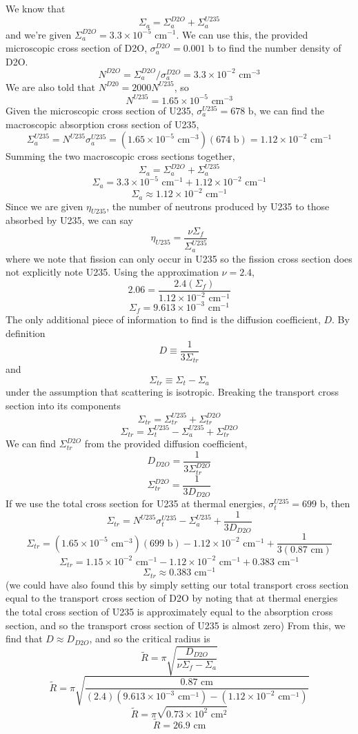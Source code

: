 \documentclass{article}
\newcommand{\Xs}{\Sigma}
\newcommand{\xs}{\sigma}
\begin{document}
We know that 
$$ \Xs_a = \Xs_a^{D2O} + \Xs_a^{U235} $$
and we're given $\Xs_a^{D2O} = 3.3\times10^{-5}\text{ cm}^{-1}$. We can use this, the provided microscopic cross section of D2O, $\xs_a^{D2O} = 0.001\text{ b}$ to find the number density of D2O.
$$ N^{D2O} = \Xs_a^{D2O}/\xs_a^{D2O} = 3.3\times10^{-2}\text{ cm}^{-3} $$
We are also told that $N^{D20} = 2000N^{U235}$, so
$$ N^{U235} = 1.65\times10^{-5}\text{ cm}^{-3} $$
Given the microscopic cross section of U235, $\xs_a^{U235} = 678\text{ b}$,
we can find the macroscopic absorption cross section of U235,
$$ \Xs_a^{U235} = N^{U235}\xs_a^{U235} = (1.65\times10^{-5}\text{ cm}^{-3})(674\text{ b}) = 1.12\times10^{-2}\text{ cm}^{-1} $$
Summing the two macroscopic cross sections together,
$$ \Xs_a = \Xs_a^{D2O} + \Xs_a^{U235} $$
$$ \Xs_a = 3.3\times10^{-5}\text{ cm}^{-1} + 1.12\times10^{-2}\text{ cm}^{-1} $$
$$ \Xs_a \approx 1.12\times10^{-2}\text{ cm}^{-1} $$
Since we are given $\eta_{U235}$, the number of neutrons produced by U235 to those absorbed by U235, we can say
$$ \eta_{U235} = \frac{\nu\Xs_f}{\Xs_a^{U235}} $$
where we note that fission can only occur in U235 so the fission cross section does not explicitly note U235. Using the approximation $\nu = 2.4$,
$$ 2.06 = \frac{2.4(\Xs_f)}{1.12\times10^{-2}\text{ cm}^{-1}} $$
$$ \Xs_f = 9.613\times10^{-3}\text{ cm}^{-1} $$
The only additional piece of information to find is the diffusion coefficient, $D$. By definition
$$ D \equiv \frac{1}{3\Xs_{tr}} $$
and 
$$ \Xs_{tr} \equiv \Xs_t - \Xs_a $$
under the assumption that scattering is isotropic. Breaking the transport cross section into its components
$$ \Xs_{tr} = \Xs_{tr}^{U235} + \Xs_{tr}^{D2O} $$
$$ \Xs_{tr} = \Xs_t^{U235} - \Xs_a^{U235} + \Xs_{tr}^{D2O}$$
We can find $\Xs_{tr}^{D2O}$ from the provided diffusion coefficient,
$$ D_{D2O} = \frac{1}{3\Xs_{tr}^{D2O}} $$
$$ \Xs_{tr}^{D2O} = \frac{1}{3D_{D2O}} $$
If we use the total cross section for U235 at thermal energies, $\xs_t^{U235} = 699\text{ b}$, then
$$ \Xs_{tr} = N^{U235}\xs_t^{U235} - \Xs_a^{U235} + \frac{1}{3D_{D2O}} $$
$$ \Xs_{tr} = (1.65\times10^{-5}\text{ cm}^{-3})(699 \text{ b}) - 1.12\times10^{-2}\text{ cm}^{-1} + \frac{1}{3(0.87\text{ cm})} $$
$$ \Xs_{tr} = 1.15\times10^{-2}\text{ cm}^{-1} - 1.12\times10^{-2}\text{ cm}^{-1} + 0.383\text{ cm}^{-1} $$
$$ \Xs_{tr} \approx 0.383\text{ cm}^{-1} $$
(we could have also found this by simply setting our total transport cross section equal to the transport cross section of D2O by noting that at thermal energies the total cross section of U235 is approximately equal to the absorption cross section, and so the transport cross section of U235 is almost zero)
From this, we find that $D \approx D_{D2O}$, and so the critical radius is
$$ \tilde{R} = \pi\sqrt{\frac{D_{D2O}}{\nu\Xs_f - \Xs_a}} $$
$$ \tilde{R} = \pi\sqrt{\frac{0.87\text{ cm}}{(2.4)(9.613\times10^{-3}\text{ cm}^{-1}) - (1.12\times10^{-2}\text{ cm}^{-1})}} $$
$$ \tilde{R} = \pi\sqrt{0.73\times10^2\text{ cm}^2} $$
$$\boxed{ \tilde{R} = 26.9\text{ cm} }$$



\end{document}
